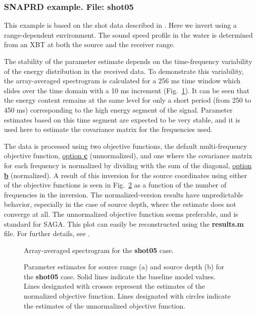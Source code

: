\documentclass{saclantc}
\begin{document}
\subsubsection{SNAPRD  example. File: {\bf shot05}}
\label{se:shot05}
This example is based on the shot data described in 
\cite{haralabus:96,haralabus:ecua3}. Here we
invert using a  range-dependent environment. The sound speed profile in the water
is determined from an XBT at both the source and the receiver range.

The stability of the parameter
estimate depends on the time-frequency variability of the energy distribution
in the received data. 
To demonstrate this variability, the array-averaged spectrogram 
is calculated for a 256 ms time window which slides
over the time domain with a 10 ms increment (Fig.~\ref{fig:fig}).   
It can be seen that the energy content remains at the same
level for only a short period (from 250 to 450 ms) 
corresponding to the high energy segment of the signal. 
Parameter estimates based on this time
segment are expected to be very stable, and it is used here to estimate
the covariance matrix for the frequencies used.

The data is processed using two objective functions,  the default 
multi-frequency objective function, 
\underline{option {\bf c}} (unnormalized), and one where the covariance
matrix for each frequency is normalized by dividing with the sum of
the diagonal, \underline{option {\bf b}} (normalized).
A result of this inversion for the source coordinates 
using either of the objective functions 
is seen in Fig.~\ref{fig:fig9} as a function of the number of
frequencies in the inversion. The
normalized-version results have unpredictable behavior, especially
in the case of source depth, where the estimate does not converge at
all.
 The unnormalized objective function seems preferable, and is standard
for {\sf SAGA}. This plot can easily be reconstructed using the {\bf
results.m} file. For further details, see 
\cite{haralabus:96,haralabus:ecua3}.

\begin{figure}
\epsfxsize=14cm
\centerline{}
\caption{\label{fig:fig} Array-averaged spectrogram for the {\bf
shot05} case. }
\end{figure}

\begin{figure}
\epsfxsize=12cm
\centerline{}
\caption{\label{fig:fig9} Parameter estimates for source range (a) and
source depth (b) for the {\bf shot05} case. Solid lines indicate the baseline
model values. Lines designated with crosses represent the estimates
of the normalized objective function.
Lines designated with circles indicate the estimates of the unnormalized
objective function.}
\end{figure} 
\end{document}
